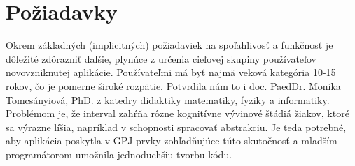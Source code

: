 \section{Požiadavky}
Okrem základných (implicitných) požiadaviek na spoľahlivosť a funkčnosť je dôležité zdôrazniť ďalšie, plynúce z určenia cieľovej skupiny používateľov novovzniknutej aplikácie. Používateľmi má byť najmä veková kategória 10-15 rokov, čo je pomerne široké rozpätie. Potvrdila nám to i doc. PaedDr. Monika Tomcsányiová, PhD. z katedry didaktiky matematiky, fyziky a informatiky. Problémom je, že interval zahŕňa rôzne kognitívne vývinové štádiá žiakov, ktoré sa výrazne líšia, napríklad v schopnosti spracovať abstrakciu. Je teda potrebné, aby aplikácia poskytla v GPJ prvky zohľadňujúce túto skutočnosť a mladším programátorom umožnila jednoduchšiu tvorbu kódu.
